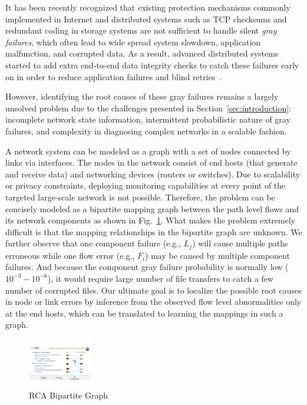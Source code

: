 It has been recently recognized that existing protection mechanisms commonly implemented in Internet and distributed systems such as TCP checksums and redundant coding in storage systems are not sufficient to handle silent {\it gray failures}, which often lead to wide spread system slowdown, application malfunction, and corrupted data. As a result, advanced distributed systems started to add extra end-to-end data integrity checks to catch these failures early on in order to reduce application failures and blind retries~\cite{swip:pearc:2019}. 

However, identifying the root causes of these gray failures remains a largely unsolved problem due to the challenges presented in Section~\ref{sec:introduction}: 
incomplete network state information, intermittent probabilistic nature of gray failures, and complexity in diagnosing complex networks in a scalable fashion.  

A network system can be modeled as a graph with a set of nodes connected by links via interfaces. The nodes in the network consist of end hosts (that generate and receive data) and networking devices (routers or switches). Due to scalability or privacy constraints, deploying monitoring capabilities at every point of the targeted large-scale network is not possible. Therefore, the problem can be concisely modeled as a bipartite mapping graph between the path level flows and its network components as shown in Fig.~\ref{fig:bipartite}. What makes the problem extremely difficult is that the mapping relationships in the bipartite graph are unknown. We further observe that one component failure (e.g., $L_j$) will cause multiple paths erroneous while one flow error (e.g., $F_i$) may be caused by multiple component failures. And because the component gray failure probability is normally low ($10^{-3} - 10^{-6}$), it would require large number of file transfers to catch a few number of corrupted files. Our ultimate goal is to localize the possible root causes in node or link errors by inference from the observed flow level abnormalities only at the end hosts, which can be translated to learning the mappings in such a graph.

\begin{figure}
  \begin{center}
    \includegraphics[width=0.25\textwidth]{./figure/RCABipartite}
  \end{center}
  \vspace{-5pt}
\caption{RCA Bipartite Graph}
\vspace{-5pt}
\label{fig:bipartite}
\end{figure}

